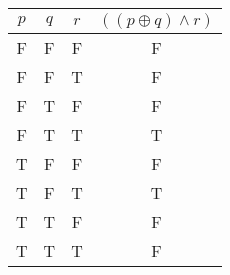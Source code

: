 \begin{tabular}{|c|c|c||c|}
\hline
$ p $ & $ q $ & $ r $ & $ ((p \oplus q) \wedge r) $ \\
\hline
F & F & F & F \\
F & F & T & F \\
F & T & F & F \\
F & T & T & T \\
T & F & F & F \\
T & F & T & T \\
T & T & F & F \\
T & T & T & F \\
\hline
\end{tabular}
\label{table:tt1}
